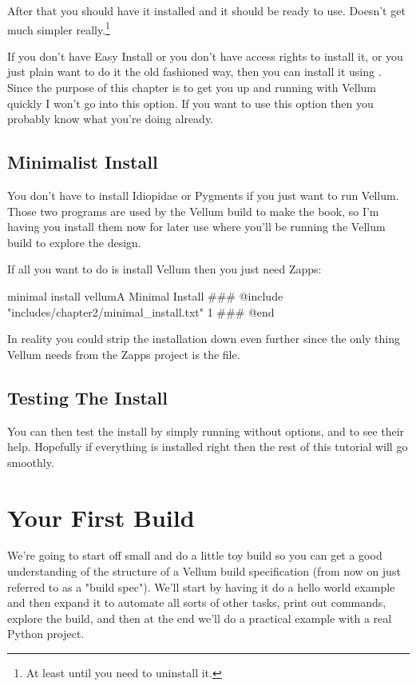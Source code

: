 After that you should have it installed and it should be ready to use.  Doesn't
get much simpler really.\footnote{At least until you need to uninstall it.}

If you don't have Easy Install or you don't have access rights to install it, or
you just plain want to do it the old fashioned way, then you can install it
using .  Since the purpose of this chapter is to get you up and
running with Vellum quickly I won't go into this option.  If you want to use
this option then you probably know what you're doing already.



\subsection{Minimalist Install}

You don't have to install Idiopidae or Pygments if you just want to run Vellum.
Those two programs are used by the Vellum build to make the book, so I'm having
you install them now for later use where you'll be running the Vellum build to
explore the design.

If all you want to do is install Vellum then you just need Zapps:

\begin{code}{minimal install vellum}{A Minimal Install}
### @include "includes/chapter2/minimal_install.txt" 1
### @end
\end{code}

In reality you could strip the installation down even further since the only
thing Vellum needs from the Zapps project is the  file.



\subsection{Testing The Install}

You can then test the install by simply running  without options,
and  to see their help.  Hopefully if everything is installed
right then the rest of this tutorial will go smoothly.



\section{Your First Build}

We're going to start off small and do a little toy build so you can get a good
understanding of the structure of a Vellum build specification (from now on just
referred to as a "build spec").  We'll start by having it do a hello
world example and then expand it to automate all sorts of other tasks, print out
commands, explore the build, and then at the end we'll do a practical example
with a real Python project.

